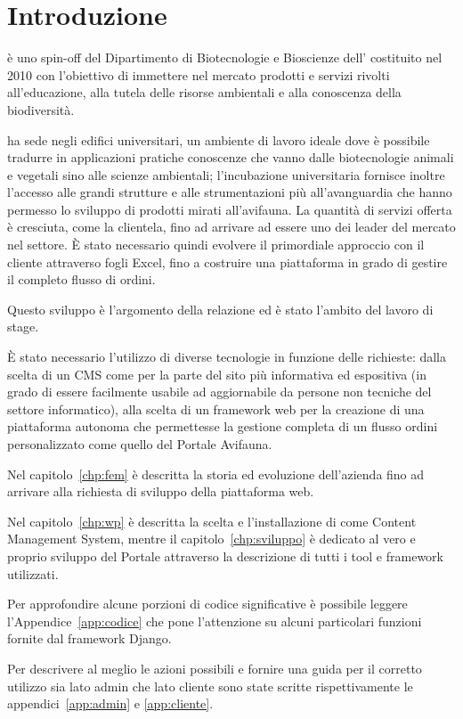 \chapter*{Introduzione} 

\textbf{\femsrl} è uno spin-off del Dipartimento di Biotecnologie e Bioscienze dell'{\unimib} costituito nel 2010 con l'obiettivo di immettere nel mercato prodotti e servizi rivolti all'educazione, alla tutela delle risorse ambientali e alla conoscenza della biodiversità. 

{\fem} ha sede negli edifici universitari, un ambiente di lavoro ideale dove è possibile tradurre in applicazioni pratiche conoscenze che vanno dalle biotecnologie animali e vegetali sino alle scienze ambientali; l'incubazione universitaria fornisce inoltre l'accesso alle grandi strutture e alle strumentazioni più all'avanguardia che hanno permesso lo sviluppo di prodotti mirati all'avifauna. La quantità di servizi offerta è cresciuta, come la clientela, fino ad arrivare ad essere uno dei leader del mercato nel settore. È stato necessario quindi evolvere il primordiale approccio con il cliente attraverso fogli Excel, fino a costruire una piattaforma in grado di gestire il completo flusso di ordini.

Questo sviluppo è l'argomento della relazione ed è stato l'ambito del lavoro di stage.

È stato necessario l'utilizzo di diverse tecnologie in funzione delle richieste: dalla scelta di un CMS come \emph{{\wp}} per la parte del sito più informativa ed espositiva (in grado di essere facilmente usabile ad aggiornabile da persone non tecniche del settore informatico), alla scelta di un framework web per la creazione di una piattaforma autonoma che permettesse la gestione completa di un flusso ordini personalizzato come quello del Portale Avifauna.
  
Nel capitolo~\ref{chp:fem} è descritta la storia ed evoluzione dell'azienda {\femsrl} fino ad arrivare alla richiesta di sviluppo della piattaforma web. 

Nel capitolo~\ref{chp:wp} è descritta la scelta e l'installazione di {\wp} come Content Management System, mentre il capitolo~\ref{chp:sviluppo} è dedicato al vero e proprio sviluppo del Portale attraverso la descrizione di tutti i tool e framework utilizzati.

Per approfondire alcune porzioni di codice significative è possibile leggere l'Appendice~\ref{app:codice} che pone l'attenzione su alcuni particolari funzioni fornite dal framework Django.

Per descrivere al meglio le azioni possibili e fornire una guida per il corretto utilizzo sia lato admin che lato cliente sono state scritte rispettivamente le appendici~\ref{app:admin} e \ref{app:cliente}.
